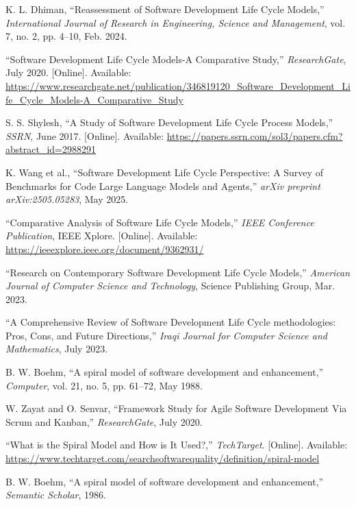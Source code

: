 \documentclass[conference]{IEEEtran}
\begin{document}
\begin{thebibliography}{00}
 K. L. Dhiman, ``Reassessment of Software Development Life Cycle Models,'' \emph{International Journal of Research in Engineering, Science and Management}, vol. 7, no. 2, pp. 4--10, Feb. 2024.

 ``Software Development Life Cycle Models-A Comparative Study,'' \emph{ResearchGate}, July 2020. [Online]. Available: \url{https://www.researchgate.net/publication/346819120_Software_Development_Life_Cycle_Models-A_Comparative_Study}

 S. S. Shylesh, ``A Study of Software Development Life Cycle Process Models,'' \emph{SSRN}, June 2017. [Online]. Available: \url{https://papers.ssrn.com/sol3/papers.cfm?abstract_id=2988291}

 K. Wang et al., ``Software Development Life Cycle Perspective: A Survey of Benchmarks for Code Large Language Models and Agents,'' \emph{arXiv preprint arXiv:2505.05283}, May 2025.

 ``Comparative Analysis of Software Life Cycle Models,'' \emph{IEEE Conference Publication}, IEEE Xplore. [Online]. Available: \url{https://ieeexplore.ieee.org/document/9362931/}

 ``Research on Contemporary Software Development Life Cycle Models,'' \emph{American Journal of Computer Science and Technology}, Science Publishing Group, Mar. 2023.

 ``A Comprehensive Review of Software Development Life Cycle methodologies: Pros, Cons, and Future Directions,'' \emph{Iraqi Journal for Computer Science and Mathematics}, July 2023.

 B. W. Boehm, ``A spiral model of software development and enhancement,'' \emph{Computer}, vol. 21, no. 5, pp. 61--72, May 1988.

 W. Zayat and O. Senvar, ``Framework Study for Agile Software Development Via Scrum and Kanban,'' \emph{ResearchGate}, July 2020.

 ``What is the Spiral Model and How is It Used?,'' \emph{TechTarget}. [Online]. Available: \url{https://www.techtarget.com/searchsoftwarequality/definition/spiral-model}

 B. W. Boehm, ``A spiral model of software development and enhancement,'' \emph{Semantic Scholar}, 1986.


\end{thebibliography}
\end{document}
